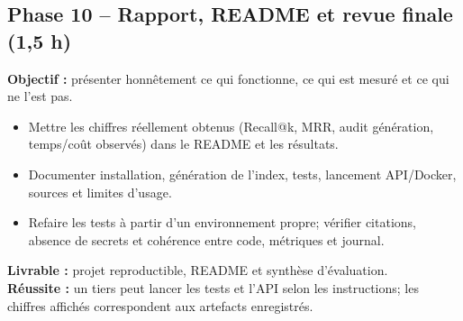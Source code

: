 \documentclass[11pt,a4paper]{article}
\begin{document}
\subsection*{Phase 10 -- Rapport, README et revue finale (1,5 h)}
\textbf{Objectif :} présenter honnêtement ce qui fonctionne, ce qui est mesuré et ce qui ne l'est pas.
\begin{itemize}
  \item Mettre les chiffres réellement obtenus (Recall@k, MRR, audit génération, temps/coût observés) dans le README et les résultats.
  \item Documenter installation, génération de l'index, tests, lancement API/Docker, sources et limites d'usage.
  \item Refaire les tests à partir d'un environnement propre; vérifier citations, absence de secrets et cohérence entre code, métriques et journal.
\end{itemize}
\textbf{Livrable :} projet reproductible, README et synthèse d'évaluation.\\
\textbf{Réussite :} un tiers peut lancer les tests et l'API selon les instructions; les chiffres affichés correspondent aux artefacts enregistrés.
\end{document}
